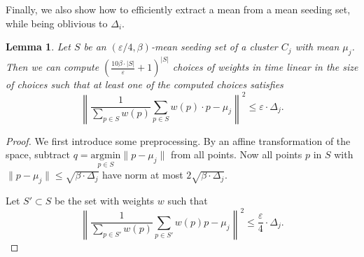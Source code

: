 \documentclass[11pt]{article}
\newtheorem{lemma}[theorem]{Lemma}
\begin{document}
Finally, we also show how to efficiently extract a mean from a mean seeding set, while being oblivious to $\Delta_i$.
\begin{lemma}
\label{lem:constructive}
    Let $S$ be an $(\varepsilon/4,\beta)$-mean seeding set of a cluster $C_j$ with mean $\mu_j$. Then we can compute    $\left(\frac{10\beta\cdot |S|}{\varepsilon}+1\right)^{|S|}$ choices of weights in time linear in the size of choices such that at least one of the computed choices satisfies
    $$\left\|\frac{1}{\sum_{p\in S} w(p)}\sum_{p\in S} w(p) \cdot p - \mu_j\right\|^2\leq \varepsilon\cdot \Delta_j.$$
\end{lemma}
\begin{proof}
We first introduce some preprocessing. By an affine transformation of the space, subtract $q = \underset{p\in S}{\text{argmin}}\|p-\mu_j\|$ from all points. Now all points $p$ in $S$ with $\|p-\mu_j\|\leq \sqrt{\beta\cdot \Delta_j}$ have norm at most $2\sqrt{\beta\cdot \Delta_j}$. 

Let $S'\subset S$ be the set with weights $w$ such that
$$\left\|\frac{1}{\sum_{p\in S'}w(p)}\sum_{p\in S'}w(p)p - \mu_j\right\|^2\leq \frac{\varepsilon}{4}\cdot \Delta_j.$$


\end{proof}
\end{document}
